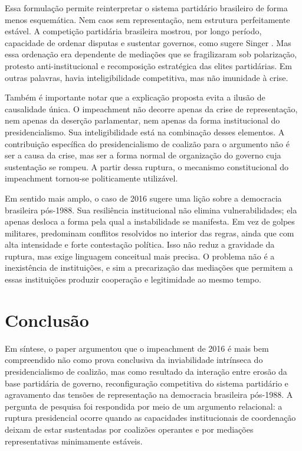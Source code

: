 \documentclass[12pt,a4paper]{article}
\begin{document}
Essa formulação permite reinterpretar o sistema partidário brasileiro de forma menos esquemática. Nem caos sem representação, nem estrutura perfeitamente estável. A competição partidária brasileira mostrou, por longo período, capacidade de ordenar disputas e sustentar governos, como sugere Singer \textcite{singersd_tres_partidos}. Mas essa ordenação era dependente de mediações que se fragilizaram sob polarização, protesto anti-institucional e recomposição estratégica das elites partidárias. Em outras palavras, havia inteligibilidade competitiva, mas não imunidade à crise.

Também é importante notar que a explicação proposta evita a ilusão de causalidade única. O impeachment não decorre apenas da crise de representação, nem apenas da deserção parlamentar, nem apenas da forma institucional do presidencialismo. Sua inteligibilidade está na combinação desses elementos. A contribuição específica do presidencialismo de coalizão para o argumento não é ser a causa da crise, mas ser a forma normal de organização do governo cuja sustentação se rompeu. A partir dessa ruptura, o mecanismo constitucional do impeachment tornou-se politicamente utilizável.

Em sentido mais amplo, o caso de 2016 sugere uma lição sobre a democracia brasileira pós-1988. Sua resiliência institucional não elimina vulnerabilidades; ela apenas desloca a forma pela qual a instabilidade se manifesta. Em vez de golpes militares, predominam conflitos resolvidos no interior das regras, ainda que com alta intensidade e forte contestação política. Isso não reduz a gravidade da ruptura, mas exige linguagem conceitual mais precisa. O problema não é a inexistência de instituições, e sim a precarização das mediações que permitem a essas instituições produzir cooperação e legitimidade ao mesmo tempo.

\section{Conclusão}
\label{sec:orgc82f077}
Em síntese, o paper argumentou que o impeachment de 2016 é mais bem compreendido não como prova conclusiva da inviabilidade intrínseca do presidencialismo de coalizão, mas como resultado da interação entre erosão da base partidária de governo, reconfiguração competitiva do sistema partidário e agravamento das tensões de representação na democracia brasileira pós-1988. A pergunta de pesquisa foi respondida por meio de um argumento relacional: a ruptura presidencial ocorre quando as capacidades institucionais de coordenação deixam de estar sustentadas por coalizões operantes e por mediações representativas minimamente estáveis.
\end{document}
